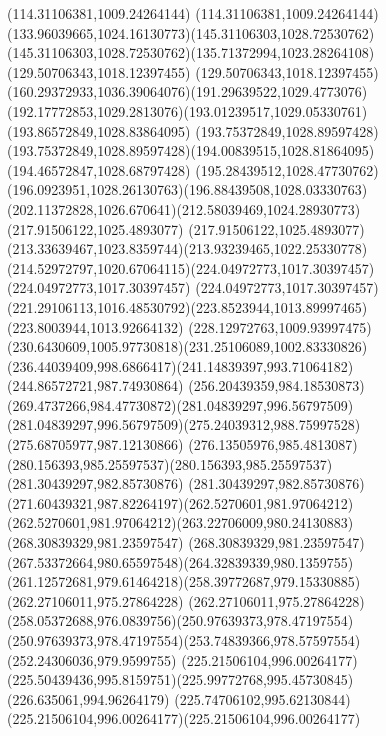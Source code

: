 {{	\lineto(114.31106381,1009.24264144)
	\curveto(114.31106381,1009.24264144)(133.96039665,1024.16130773)(145.31106303,1028.72530762)
	\curveto(145.31106303,1028.72530762)(135.71372994,1023.28264108)(129.50706343,1018.12397455)
	\curveto(129.50706343,1018.12397455)(160.29372933,1036.39064076)(191.29639522,1029.4773076)
	\curveto(192.17772853,1029.2813076)(193.01239517,1029.05330761)(193.86572849,1028.83864095)
	\lineto(193.75372849,1028.89597428)
	\curveto(193.75372849,1028.89597428)(194.00839515,1028.81864095)(194.46572847,1028.68797428)
	\curveto(195.28439512,1028.47730762)(196.0923951,1028.26130763)(196.88439508,1028.03330763)
	\curveto(202.11372828,1026.670641)(212.58039469,1024.28930773)(217.91506122,1025.4893077)
	\curveto(217.91506122,1025.4893077)(213.33639467,1023.8359744)(213.93239465,1022.25330778)
	\curveto(214.52972797,1020.67064115)(224.04972773,1017.30397457)(224.04972773,1017.30397457)
	\curveto(224.04972773,1017.30397457)(221.29106113,1016.48530792)(223.8523944,1013.89997465)
	\lineto(223.8003944,1013.92664132)
	\curveto(228.12972763,1009.93997475)(230.6430609,1005.97730818)(231.25106089,1002.83330826)
	\curveto(236.44039409,998.6866417)(241.14839397,993.71064182)(244.86572721,987.74930864)
	\curveto(256.20439359,984.18530873)(269.4737266,984.47730872)(281.04839297,996.56797509)
	\curveto(281.04839297,996.56797509)(275.24039312,988.75997528)(275.68705977,987.12130866)
	\curveto(276.13505976,985.4813087)(280.156393,985.25597537)(280.156393,985.25597537)
	\lineto(281.30439297,982.85730876)
	\curveto(281.30439297,982.85730876)(271.60439321,987.82264197)(262.5270601,981.97064212)
	\curveto(262.5270601,981.97064212)(263.22706009,980.24130883)(268.30839329,981.23597547)
	\curveto(268.30839329,981.23597547)(267.53372664,980.65597548)(264.32839339,980.1359755)
	\curveto(261.12572681,979.61464218)(258.39772687,979.15330885)(262.27106011,975.27864228)
	\curveto(262.27106011,975.27864228)(258.05372688,976.0839756)(250.97639373,978.47197554)
	\curveto(250.97639373,978.47197554)(253.74839366,978.57597554)(252.24306036,979.9599755)
	\moveto(225.21506104,996.00264177)
	\curveto(225.50439436,995.8159751)(225.99772768,995.45730845)(226.635061,994.96264179)
	\curveto(225.74706102,995.62130844)(225.21506104,996.00264177)(225.21506104,996.00264177)
}
}
{
}
